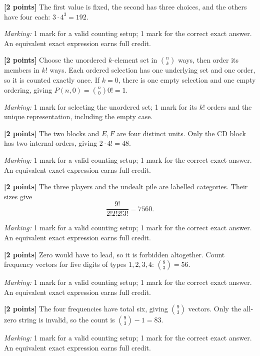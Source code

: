 \documentclass[12pt,letterpaper]{article}
\begin{document}
\begin{description}[font=\normalfont,leftmargin=1.2em,labelsep=0.4em]
\item[(a)] \textbf{[2 points]} The first value is fixed, the second has three choices, and the others have four each: $3\cdot4^3=192$.
\par\textit{Marking:} 1 mark for a valid counting setup; 1 mark for the correct exact answer. An equivalent exact expression earns full credit.
\item[(b)] \textbf{[2 points]} Choose the unordered $k$-element set in $\binom nk$ ways, then order its members in $k!$ ways. Each ordered selection has one underlying set and one order, so it is counted exactly once. If $k=0$, there is one empty selection and one empty ordering, giving $P(n,0)=\binom n0 0!=1$.
\par\textit{Marking:} 1 mark for selecting the unordered set; 1 mark for its $k!$ orders and the unique representation, including the empty case.
\item[(c)] \textbf{[2 points]} The two blocks and $E,F$ are four distinct units. Only the CD block has two internal orders, giving $2\cdot4!=48$.
\par\textit{Marking:} 1 mark for a valid counting setup; 1 mark for the correct exact answer. An equivalent exact expression earns full credit.
\item[(d)] \textbf{[2 points]} The three players and the undealt pile are labelled categories. Their sizes give\[\frac{9!}{2!2!2!3!}=7560.\]
\par\textit{Marking:} 1 mark for a valid counting setup; 1 mark for the correct exact answer. An equivalent exact expression earns full credit.
\item[(e)] \textbf{[2 points]} Zero would have to lead, so it is forbidden altogether. Count frequency vectors for five digits of types $1,2,3,4$: $\binom83=56$.
\par\textit{Marking:} 1 mark for a valid counting setup; 1 mark for the correct exact answer. An equivalent exact expression earns full credit.
\item[(f)] \textbf{[2 points]} The four frequencies have total six, giving $\binom93$ vectors. Only the all-zero string is invalid, so the count is $\binom93-1=83$.
\par\textit{Marking:} 1 mark for a valid counting setup; 1 mark for the correct exact answer. An equivalent exact expression earns full credit.

\end{description}
\end{document}
